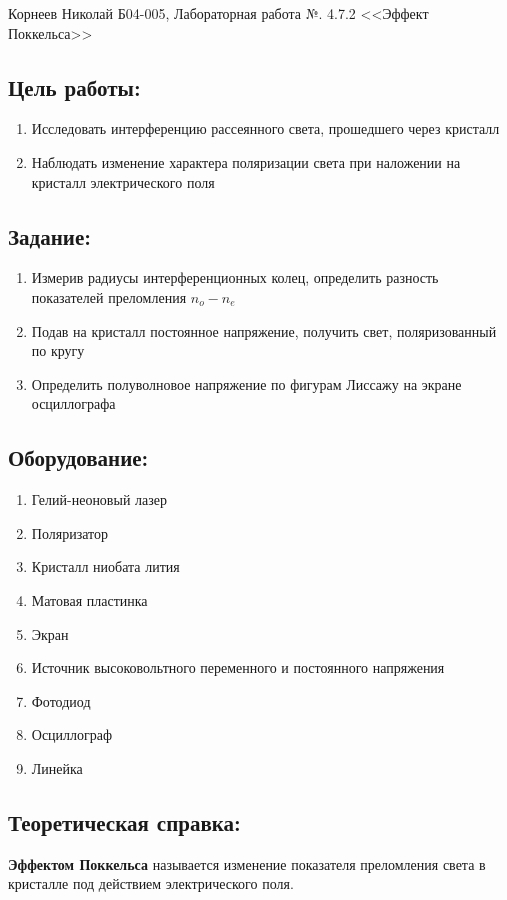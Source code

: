 \documentclass[a4paper,12pt]{article}
\author{Бичина Марина 
группа Б04-005 1 курса ФЭФМ}
\title{}
\date{}
\begin{document}

\begin{center}
\begin{Large}
{Корнеев Николай Б04-005, Лабораторная работа №. 4.7.2 <<Эффект Поккельса>>}
\end{Large}
\end{center}
\subsection*{Цель работы:} 
\begin{enumerate}
\itemsep0em
\item Исследовать интерференцию рассеянного света, прошедшего через кристалл
\item Наблюдать изменение характера поляризации света при наложении на кристалл электрического поля
\end{enumerate}
\subsection*{Задание:}
\begin{enumerate}
\itemsep0em
\item Измерив радиусы интерференционных колец, определить разность показателей преломления $n_{o}-n_{e}$
\item Подав на кристалл постоянное напряжение, получить свет, поляризованный по кругу
\item Определить полуволновое напряжение по фигурам Лиссажу на экране осциллографа
\end{enumerate}
\subsection*{Оборудование:}
\begin{enumerate}
\itemsep0em
\item Гелий-неоновый лазер
\item Поляризатор
\item Кристалл ниобата лития
\item Матовая пластинка
\item Экран
\item Источник высоковольтного переменного и постоянного напряжения
\item Фотодиод
\item Осциллограф
\item Линейка
\end{enumerate}


\subsection*{Теоретическая справка:}
\textbf{Эффектом Поккельса} называется изменение показателя преломления света в кристалле под действием электрического поля.
\end{document}
